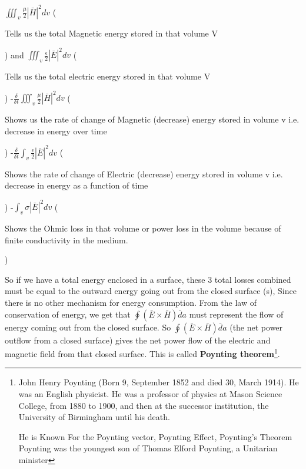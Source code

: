 $ \iiint_{v}\frac{\mu}{2}|\bar{H}|^{2}dv $ 
(\begin{small}
Tells us the total Magnetic energy stored in that volume V
\end{small})
and
$ \iiint_{v} \frac{\epsilon}{2}|\bar{E}|^{2}dv $ 
(\begin{small}
Tells us the total electric energy stored in that volume V     
\end{small})
-$\frac{\delta}{\delta t}\iiint_{v}\frac{\mu}{2}|\bar{H}|^{2}dv$
(\begin{small}
Shows us the rate of change of Magnetic (decrease) energy stored in volume v i.e. decrease in energy over time     
\end{small})
-$\frac{\delta}{\delta t}\int_{v}\frac{\epsilon}{2}|\bar{E}|^{2}dv$
(\begin{small}
Shows the rate of change of Electric (decrease) energy stored in volume v i.e. decrease in energy as a function of time    
\end{small})
-$\int_{v}\sigma|\bar{E}|^{2}dv$
(\begin{small}
Shows the Ohmic loss in that volume or power loss in the volume because of finite conductivity in the medium.   
\end{small})

So if we have a total energy enclosed in a surface, these 3 total losses combined must be equal to the outward energy going out from the closed surface (s), Since there is no other mechanism for energy consumption. From the law of conservation of energy, we get that $ \oint(\bar{E}\times\bar{H})\bar{d}a $ must represent the flow of energy coming out from the closed surface. So $ \oint(\bar{E}\times\bar{H})\bar{d}a $ (the net power outflow from a closed surface)  gives the net power flow of the electric and magnetic field from that closed surface. This is called \textbf{Poynting theorem}\footnote{John Henry Poynting (Born 9, September 1852 and died 30, March 1914). He was an English physicist. He was a professor of physics at Mason Science College, from 1880 to 1900, and then at the successor institution, the University of Birmingham until his death.

He is Known For the Poynting vector, Poynting Effect, Poynting's Theorem 
Poynting was the youngest son of Thomas Elford Poynting, a Unitarian minister}. 

